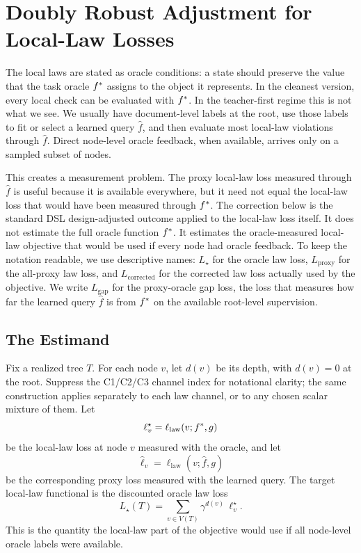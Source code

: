\section{Doubly Robust Adjustment for Local-Law Losses}
\label{app:doubly-robust-local-law-adjustment}

The local laws are stated as oracle conditions: a state should preserve
the value that the task oracle \(f^\ast\) assigns to the object it
represents. In the cleanest version, every local check can be evaluated
with \(f^\ast\). In the teacher-first regime this is not what we see.
We usually have document-level labels at the root, use those labels to
fit or select a learned query \(\widehat f\), and then evaluate most
local-law violations through \(\widehat f\). Direct node-level oracle
feedback, when available, arrives only on a sampled subset of nodes.

This creates a measurement problem. The proxy local-law loss measured
through \(\widehat f\) is useful because it is available everywhere, but
it need not equal the local-law loss that would have been measured
through \(f^\ast\). The correction below is the standard DSL
design-adjusted outcome applied to the local-law loss itself. It does
not estimate the full oracle function \(f^\ast\). It estimates the
oracle-measured local-law objective that would be used if every node
had oracle feedback. To keep the notation readable, we use descriptive
names: \(L_\star\) for the oracle law loss, \(L_{\mathrm{proxy}}\) for
the all-proxy law loss, and \(L_{\mathrm{corrected}}\) for the
corrected law loss actually used by the objective. We write
\(L_{\mathrm{gap}}\) for the proxy-oracle gap loss, the loss that
measures how far the learned query \(\widehat f\) is from \(f^\ast\) on
the available root-level supervision.

\subsection{The Estimand}
\label{app:drlaw-estimand}

Fix a realized tree \(T\). For each node \(v\), let \(d(v)\) be its
depth, with \(d(v)=0\) at the root. Suppress the C1/C2/C3 channel index
for notational clarity; the same construction applies separately to
each law channel, or to any chosen scalar mixture of them. Let
\[
  \ell_v^\star
  =
  \ell_{\mathrm{law}}(v;f^\ast,g)
\]
be the local-law loss at node \(v\) measured with the oracle, and let
\[
  \widehat\ell_v
  =
  \ell_{\mathrm{law}}(v;\widehat f,g)
\]
be the corresponding proxy loss measured with the learned query. The
target local-law functional is the discounted oracle law loss
\begin{equation}
\label{eq:drlaw-oracle-objective}
  L_\star(T)
  =
  \sum_{v\in V(T)}
  \gamma^{d(v)}\,\ell_v^\star .
\end{equation}
This is the quantity the local-law part of the objective would use if
all node-level oracle labels were available.


